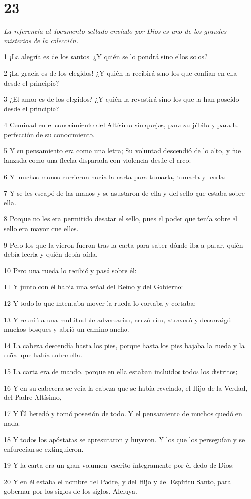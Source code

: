 \chapter{23}

\par \textit{La referencia al documento sellado enviado por Dios es uno de los grandes misterios de la colección.}

\par 1 ¡La alegría es de los santos! ¿Y quién se lo pondrá sino ellos solos?
\par 2 ¡La gracia es de los elegidos! ¿Y quién la recibirá sino los que confían en ella desde el principio?
\par 3 ¿El amor es de los elegidos? ¿Y quién la revestirá sino los que la han poseído desde el principio?
\par 4 Caminad en el conocimiento del Altísimo sin quejas, para su júbilo y para la perfección de su conocimiento.
\par 5 Y su pensamiento era como una letra; Su voluntad descendió de lo alto, y fue lanzada como una flecha disparada con violencia desde el arco:
\par 6 Y muchas manos corrieron hacia la carta para tomarla, tomarla y leerla:
\par 7 Y se les escapó de las manos y se asustaron de ella y del sello que estaba sobre ella.
\par 8 Porque no les era permitido desatar el sello, pues el poder que tenía sobre el sello era mayor que ellos.
\par 9 Pero los que la vieron fueron tras la carta para saber dónde iba a parar, quién debía leerla y quién debía oírla.
\par 10 Pero una rueda lo recibió y pasó sobre él:
\par 11 Y junto con él había una señal del Reino y del Gobierno:
\par 12 Y todo lo que intentaba mover la rueda lo cortaba y cortaba:
\par 13 Y reunió a una multitud de adversarios, cruzó ríos, atravesó y desarraigó muchos bosques y abrió un camino ancho.
\par 14 La cabeza descendía hasta los pies, porque hasta los pies bajaba la rueda y la señal que había sobre ella.
\par 15 La carta era de mando, porque en ella estaban incluidos todos los distritos;
\par 16 Y en su cabecera se veía la cabeza que se había revelado, el Hijo de la Verdad, del Padre Altísimo,
\par 17 Y Él heredó y tomó posesión de todo. Y el pensamiento de muchos quedó en nada.
\par 18 Y todos los apóstatas se apresuraron y huyeron. Y los que los perseguían y se enfurecían se extinguieron.
\par 19 Y la carta era un gran volumen, escrito íntegramente por él dedo de Dios:
\par 20 Y en él estaba el nombre del Padre, y del Hijo y del Espíritu Santo, para gobernar por los siglos de los siglos. Aleluya.

